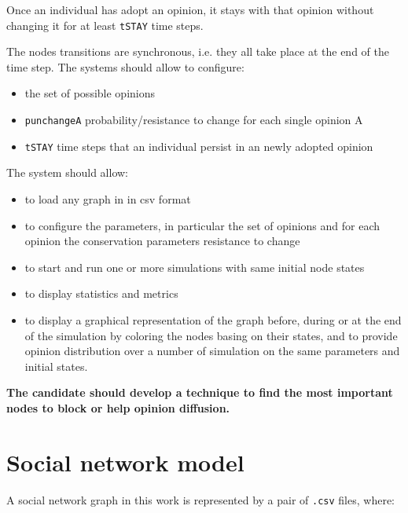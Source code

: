 \documentclass[11pt]{article}
\begin{document}
\medskip

\noindent Once an individual has adopt an opinion, it stays with that opinion without changing it for at least \verb|tSTAY| time steps.

\medskip

\noindent The nodes transitions are synchronous, i.e. they all take place at the end of the time step. The systems should allow to configure:

\begin{itemize}
	\setlength\itemsep{0.2em}

	\item the set of possible opinions
	\item \verb|punchangeA| probability/resistance to change for each single opinion A
	\item \verb|tSTAY| time steps that an individual persist in an newly adopted opinion
\end{itemize}

\noindent The system should allow:

\begin{itemize}
	\setlength\itemsep{0.2em}

	\item to load any graph in in csv format
	\item to configure the parameters, in particular the set of opinions and for each opinion the conservation parameters resistance to change
	\item to start and run one or more simulations with same initial node states
	\item to display statistics and metrics
	\item to display a graphical representation of the graph before, during or at the end of the simulation by coloring the nodes basing on their states, and to provide opinion distribution over a number of simulation on the same parameters and initial states.
\end{itemize}

\noindent \textbf{The candidate should develop a technique to find the most important nodes to block or help opinion diffusion.}

\section{Social network model}
\label{Section:Model}

A social network graph in this work is represented by a pair of \verb|.csv| files, where:
\end{document}
